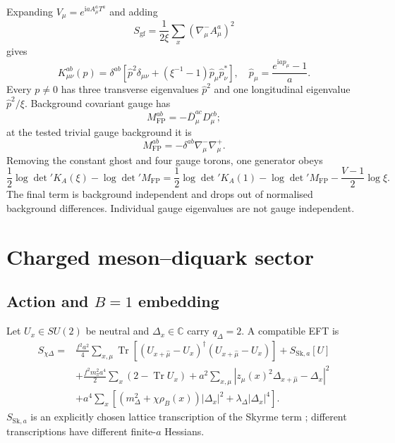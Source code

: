 \documentclass[11pt]{article}
\theoremstyle{definition}
\theoremstyle{remark}
\newcommand{\ii}{\mathrm i}
\newcommand{\Tr}{\operatorname{Tr}}
\begin{document}
Expanding \(V_\mu=e^{\ii aA_\mu^aT^a}\) and adding
\[
 S_{\mathrm{gf}}=\frac1{2\xi}\sum_x
 \left(\nabla_\mu^-A_\mu^a\right)^2
\]
gives
\begin{equation}
 K_{\mu\nu}^{ab}(p)=\delta^{ab}\left[
 \widehat p^2\delta_{\mu\nu}+
(\xi^{-1}-1)\widehat p_\mu\widehat p_\nu^\ast\right],
 \quad
 \widehat p_\mu=\frac{e^{\ii ap_\mu}-1}{a}.
 \label{eq:gauge-kernel}
\end{equation}
Every \(p\ne0\) has three transverse eigenvalues \(\widehat p^2\) and one
longitudinal eigenvalue \(\widehat p^2/\xi\).  Background covariant gauge
has
\[
 M_{\mathrm{FP}}^{ab}=-\overline D_\mu^{ac}D_\mu^{cb};
\]
at the tested trivial gauge background it is
\begin{equation}
 M_{\mathrm{FP}}^{ab}=-\delta^{ab}\nabla_\mu^-\nabla_\mu^+.
 \label{eq:fp}
\end{equation}
Removing the constant ghost and four gauge torons, one generator obeys
\begin{equation}
 \frac12\log\det'K_A(\xi)-\log\det'M_{\mathrm{FP}}
 =
 \frac12\log\det'K_A(1)-\log\det'M_{\mathrm{FP}}
 -\frac{V-1}{2}\log\xi .
 \label{eq:xi}
\end{equation}
The final term is background independent and drops out of normalised
background differences.  Individual gauge eigenvalues are not
gauge independent.

\section{Charged meson--diquark sector}

\subsection{\texorpdfstring{Action and \(B=1\) embedding}{Action and B=1 embedding}}

Let \(U_x\in SU(2)\) be neutral and \(\Delta_x\in\mathbb C\) carry
\(q_\Delta=2\).  A compatible EFT is
\begin{align}
 S_{\chi\Delta}
 =&\frac{f^2a^2}{4}\sum_{x,\mu}
 \Tr[(U_{x+\hat\mu}-U_x)^\dagger(U_{x+\hat\mu}-U_x)]
 +S_{\mathrm{Sk},a}[U]\nonumber\\
 &+\frac{f^2m_\pi^2a^4}{2}\sum_x(2-\Tr U_x)
 +a^2\sum_{x,\mu}|z_\mu(x)^2\Delta_{x+\hat\mu}-\Delta_x|^2\nonumber\\
 &+a^4\sum_x\left[
 (m_\Delta^2+\chi\rho_B(x))|\Delta_x|^2
 +\lambda_\Delta|\Delta_x|^4\right].
 \label{eq:eft}
\end{align}
\(S_{\mathrm{Sk},a}\) is an explicitly chosen lattice transcription of the
Skyrme term \cite{Skyrme1961}; different transcriptions have different
finite-\(a\) Hessians.
\end{document}
